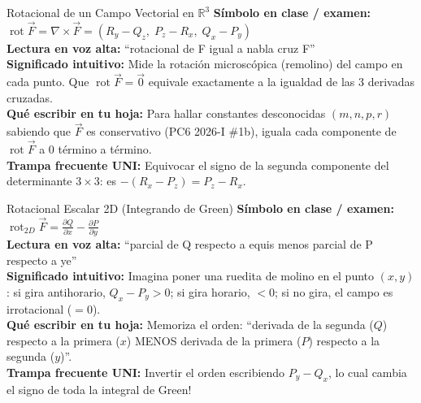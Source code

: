 \documentclass[11pt,a4paper]{article}
\begin{document}
\begin{definicionbox}{Rotacional de un Campo Vectorial en $\mathbb{R}^3$}
\textbf{Símbolo en clase / examen:} $\operatorname{rot}\vec{F} = \nabla \times \vec{F} = (R_y - Q_z,\; P_z - R_x,\; Q_x - P_y)$\\[0.15cm]
\textbf{Lectura en voz alta:} ``rotacional de F igual a nabla cruz F''\\[0.12cm]
\textbf{Significado intuitivo:} Mide la rotación microscópica (remolino) del campo en cada punto. Que $\operatorname{rot}\vec{F} = \vec{0}$ equivale exactamente a la igualdad de las 3 derivadas cruzadas.\\[0.12cm]
\textbf{Qué escribir en tu hoja:} Para hallar constantes desconocidas $(m,n,p,r)$ sabiendo que $\vec{F}$ es conservativo (PC6 2026-I \#1b), iguala cada componente de $\operatorname{rot}\vec{F}$ a $0$ término a término.\\[0.12cm]
\textbf{Trampa frecuente UNI:} Equivocar el signo de la segunda componente del determinante $3\times 3$: es $-(R_x - P_z) = P_z - R_x$.
\end{definicionbox}

\begin{definicionbox}{Rotacional Escalar 2D (Integrando de Green)}
\textbf{Símbolo en clase / examen:} $\operatorname{rot}_{2D}\vec{F} = \frac{\partial Q}{\partial x} - \frac{\partial P}{\partial y}$\\[0.15cm]
\textbf{Lectura en voz alta:} ``parcial de Q respecto a equis menos parcial de P respecto a ye''\\[0.12cm]
\textbf{Significado intuitivo:} Imagina poner una ruedita de molino en el punto $(x,y)$: si gira antihorario, $Q_x - P_y > 0$; si gira horario, $< 0$; si no gira, el campo es irrotacional ($=0$).\\[0.12cm]
\textbf{Qué escribir en tu hoja:} Memoriza el orden: ``derivada de la segunda ($Q$) respecto a la primera ($x$) MENOS derivada de la primera ($P$) respecto a la segunda ($y$)''.\\[0.12cm]
\textbf{Trampa frecuente UNI:} Invertir el orden escribiendo $P_y - Q_x$, lo cual cambia el signo de toda la integral de Green!
\end{definicionbox}
\end{document}
